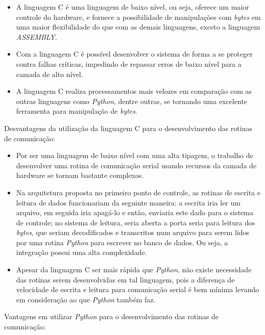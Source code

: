 \begin{itemize}
    \item A linguagem C é uma linguagem de baixo nível, ou seja, oferece um maior controle do hardware, e fornece a possibilidade de manipulações com \textit{bytes} em uma maior flexibilidade do que com as demais linguagens, exceto a linguagem \textit{ASSEMBLY}.
    \item Com a linguagem C é possível desenvolver o sistema de forma a se proteger contra falhas críticas, impedindo de repassar erros de baixo nível para a camada de alto nível.
    \item A linguagem C realiza processamentos mais velozes em comparação com as outras linguagens como \textit{Python}, dentre outras, se tornando uma excelente ferramenta para manipulação de \textit{bytes}.
\end{itemize}

Desvantagens da utilização da linguagem C para o desenvolvimento das rotinas de comunicação:

\begin{itemize}
    \item Por ser uma linguagem de baixo nível com uma alta tipagem, o trabalho de desenvolver uma rotina de comunicação serial usando recursos da camada de hardware se tornam bastante complexos.
    \item Na arquitetura proposta no primeiro ponto de controle, as rotinas de escrita e leitura de dados funcionariam da seguinte maneira: a escrita iria ler um arquivo, em seguida iria apagá-lo e então, enviaria este dado para o sistema de controle; no sistema de leitura, seria aberta a porta seria para leitura dos \textit{bytes}, que seriam decodificados e transcritos num arquivo para serem lidos por uma rotina \textit{Python} para escrever no banco de dados. Ou seja, a integração possui uma alta complexidade.
    \item Apesar da linguagem C ser mais rápida que \textit{Python}, não existe necessidade das rotinas serem desenvolvidas em tal linguagem, pois a diferença de velocidade de escrita e leitura para comunicação serial é bem mínima levando em consideração ao que \textit{Python} também faz.
\end{itemize}

Vantagens em utilizar \textit{Python} para o desenvolvimento das rotinas de comunicação:

